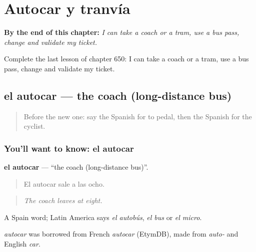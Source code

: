 
\chapter{Autocar y tranvía}
\label{ch:es-autocar-y-tranvia}

\begin{chapteropening}
\textbf{By the end of this chapter:} \emph{I can take a coach or a tram, use a bus pass, change and validate my ticket.}

Complete the last lesson of chapter 650: I can take a coach or a tram, use a bus pass, change and validate my ticket.
\end{chapteropening}

\section[el autocar]{el autocar — the coach (long-distance bus)}

\label{lesson:ES-C650-autocar}



\begin{quote}
Before the new one: say the Spanish for to pedal, then the Spanish for the cyclist.
\end{quote}

\subsection*{You'll want to know: el autocar}
\textbf{el autocar} — \textquotedblleft{}the coach (long-distance bus)\textquotedblright{}.

\begin{quote}
El autocar sale a las ocho.
\end{quote}

\begin{quote}
\emph{The coach leaves at eight.}
\end{quote}

A Spain word; Latin America says \emph{el autobús}, \emph{el bus} or \emph{el micro}.

\begin{cousinweb}
\emph{autocar} was borrowed from French \emph{autocar} (EtymDB), made from \emph{auto-} and English \emph{car}.
\end{cousinweb}

